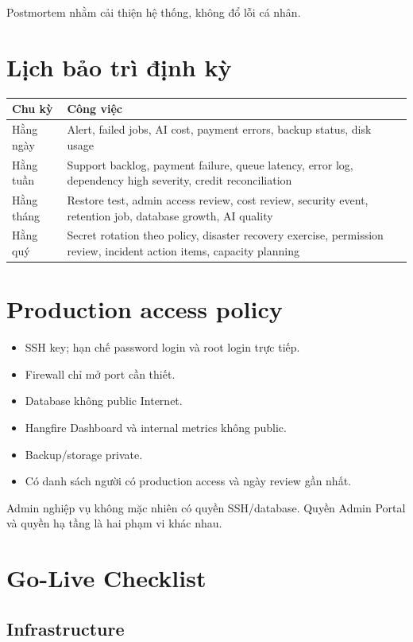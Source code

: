 \documentclass[11pt,a4paper]{article}
\begin{document}
Postmortem nhằm cải thiện hệ thống, không đổ lỗi cá nhân.

\section{Lịch bảo trì định kỳ}

\begin{longtable}{L{0.18\textwidth}L{0.74\textwidth}}
\toprule
\textbf{Chu kỳ} & \textbf{Công việc} \\
\midrule
Hằng ngày & Alert, failed jobs, AI cost, payment errors, backup status, disk usage \\
Hằng tuần & Support backlog, payment failure, queue latency, error log, dependency high severity, credit reconciliation \\
Hằng tháng & Restore test, admin access review, cost review, security event, retention job, database growth, AI quality \\
Hằng quý & Secret rotation theo policy, disaster recovery exercise, permission review, incident action items, capacity planning \\
\bottomrule
\end{longtable}

\section{Production access policy}

\begin{itemize}
  \item SSH key; hạn chế password login và root login trực tiếp.
  \item Firewall chỉ mở port cần thiết.
  \item Database không public Internet.
  \item Hangfire Dashboard và internal metrics không public.
  \item Backup/storage private.
  \item Có danh sách người có production access và ngày review gần nhất.
\end{itemize}

Admin nghiệp vụ không mặc nhiên có quyền SSH/database. Quyền Admin Portal và quyền hạ tầng là hai phạm vi khác nhau.

\section{Go-Live Checklist}

\subsection{Infrastructure}
\end{document}
